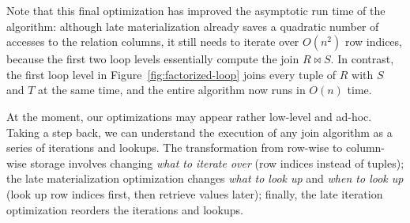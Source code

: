 Note that this final optimization has improved the asymptotic
run time of the algorithm:
although late materialization already saves a quadratic
number of accesses to the relation columns,
it still needs to iterate over $O(n^2)$ row indices,
because the first two loop levels essentially compute
the join $R \bowtie S$.
In contrast, the first loop level in Figure~\ref{fig:factorized-loop}
joins every tuple of $R$ with $S$ and $T$ at the same time,
and the entire algorithm now runs in $O(n)$ time.

At the moment, our optimizations may appear rather low-level and ad-hoc.
Taking a step back, we can understand the execution of
any join algorithm as a series of iterations and lookups.
The transformation from row-wise to column-wise storage
involves changing {\em what to iterate over} (row indices instead of tuples);
the late materialization optimization changes {\em what to look up}
and {\em when to look up} (look up row indices first, then retrieve values later);
finally, the late iteration optimization reorders the iterations and lookups.

